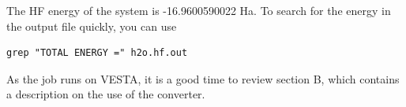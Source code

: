 The HF energy of the
system is -16.9600590022 Ha. To search for the energy in the output file quickly, you can
use 
\begin{shaded}
\begin{verbatim}
grep "TOTAL ENERGY =" h2o.hf.out
\end{verbatim}
\end{shaded}
As the job runs on VESTA, it is a good time to review section B, which contains a description on the use of the converter.


